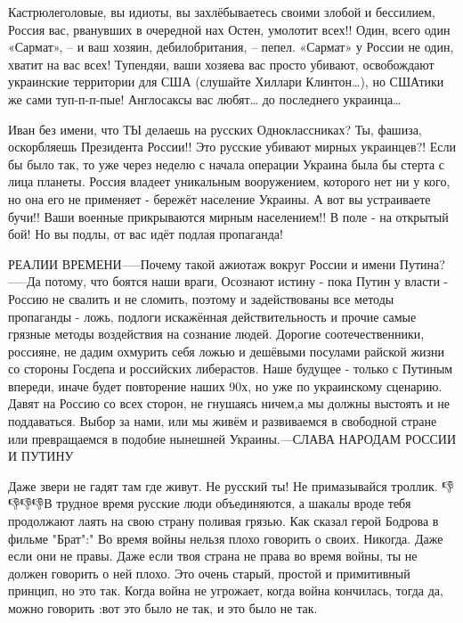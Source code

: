 
Кастрюлеголовые, вы идиоты, вы захлёбываетесь своими злобой и бессилием, Россия
вас, рванувших в очередной нах Остен, умолотит всех!! Один, всего один
«Сармат», – и ваш хозяин, дебилобритания, – пепел. «Сармат» у России не один,
хватит на вас всех! Тупендяи, ваши хозяева вас просто убивают, освобождают
украинские территории для США (слушайте Хиллари Клинтон…), но СШАтики же сами
туп-п-п-пые! Англосаксы вас любят… до последнего украинца…


Иван без имени, что ТЫ делаешь на русских Одноклассниках? Ты, фашиза,
оскорбляешь Президента России!! Это русские убивают мирных украинцев?! Если бы
было так, то уже через неделю с начала операции Украина была бы стерта с лица
планеты. Россия владеет уникальным вооружением, которого нет ни у кого, но она
его не применяет - бережёт население Украины. А вот вы устраиваете бучи!! Ваши
военные прикрываются мирным населением!! В поле - на открытый бой! Но вы подлы,
от вас идёт подлая пропаганда!


РЕАЛИИ ВРЕМЕНИ-----Почему такой ажиотаж вокруг России и имени Путина? -----Да
потому, что боятся наши враги, Осознают истину - пока Путин у власти - Россию
не свалить и не сломить, поэтому и задействованы все методы пропаганды - ложь,
подлоги искажённая действительность и прочие самые грязные методы воздействия
на сознание людей. Дорогие соотечественники, россияне, не дадим охмурить себя
ложью и дешёвыми посулами райской жизни со стороны Госдепа и российских
либерастов. Наше будущее - только с Путиным впереди, иначе будет повторение
наших 90х, но уже по украинскому сценарию. Давят на Россию со всех сторон, не
гнушаясь ничем,а мы должны выстоять и не поддаваться. Выбор за нами, или мы
живём и развиваемся в свободной стране или превращаемся в подобие нынешней
Украины.---СЛАВА НАРОДАМ РОССИИ И ПУТИНУ


Даже звери не гадят там где живут. Не русский ты! Не примазывайся троллик.
👎👎👎👎В трудное время русские люди объединяются, а шакалы вроде тебя
продолжают лаять на свою страну поливая грязью. Как сказал герой Бодрова в
фильме "Брат":" Во время войны нельзя плохо говорить о своих. Никогда. Даже
если они не правы. Даже если твоя страна не права во время войны, ты не должен
говорить о ней плохо. Это очень старый, простой и примитивный принцип, но это
так. Когда война не угрожает, когда война кончилась, тогда да, можно говорить
:вот это было не так, и это было не так.

